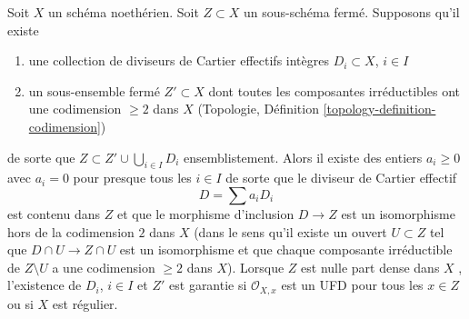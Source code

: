\begin{lemma}
\label{lemma-codim-1-part}
Soit  $X$  un schéma noethérien. Soit  $Z \subset X$  un sous-schéma fermé.
Supposons qu'il existe
\begin{enumerate}
\item une collection de diviseurs de Cartier effectifs intègres  $D_i \subset X$,
 $i \in I$
\item un sous-ensemble fermé  $Z' \subset X$  dont toutes les composantes irréductibles ont
une codimension  $\geq 2$  dans  $X$  (Topologie, Définition
 \ref{topology-definition-codimension})
\end{enumerate}
 de sorte que  $Z \subset Z' \cup \bigcup_{i \in I} D_i$  ensemblistement. Alors il
existe des entiers  $a_i \geq 0$  avec  $a_i = 0$  pour presque tous les
 $i \in I$  de sorte que le diviseur de Cartier effectif
$$
D = \sum a_i D_i
$$
est contenu dans  $Z$  et que le morphisme d'inclusion  $D \to Z$  est un
isomorphisme hors de la codimension  $2$  dans  $X$  (dans le sens
qu'il existe un ouvert  $U \subset Z$  tel que  $D \cap U \to Z \cap U$  est un isomorphisme et
que chaque composante irréductible de  $Z \setminus U$  a une codimension  $\geq 2$ 
dans  $X$). Lorsque  $Z$  est nulle part dense dans  $X$ , l'existence
de  $D_i$,  $i \in I$  et  $Z'$  est garantie si  $\mathcal{O}_{X, x}$  est un
UFD pour tous les  $x \in Z$  ou si  $X$  est régulier.
\end{lemma}


